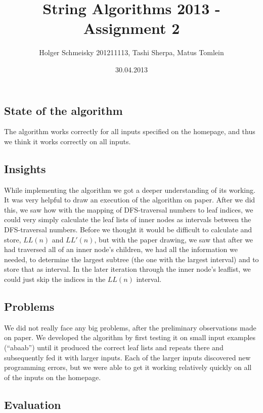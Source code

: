 \documentclass[a4paper,10pt]{article}
\title{String Algorithms 2013 - Assignment 2}
\author{Holger Schmeisky  201211113, Tashi Sherpa, Matus Tomlein}
\date{30.04.2013}
\begin{document}
\maketitle

\subsection*{State of the algorithm}
The algorithm works correctly for all inputs specified on the homepage, and thus we think it works correctly on all inputs.

\subsection*{Insights}
While implementing the algorithm we got a deeper understanding of its working.\\ 
It was very helpful to draw an execution of the algorithm on paper. After we did this, we saw how with the mapping of DFS-traversal numbers to leaf indices, we could very simply calculate the leaf lists of inner nodes as intervals between the DFS-traversal numbers. Before we thought it would be difficult to calculate and store, $LL(n)$ and $LL'(n)$, but with the paper drawing, we saw that after we had traversed all of an inner node's children, we had all the information we needed, to determine the largest subtree (the one with the largest interval) and to store that as interval. In the later iteration through the inner node's leaflist, we could just skip the indices in the $LL(n)$ interval.

\subsection*{Problems}
We did not really face any big problems, after the preliminary observations made on paper. We developed the algorithm by first testing it on small input examples (``abaab'') until it produced the correct leaf lists and repeats there and subsequently fed it with larger inputs. Each of the larger inputs discovered new programming errors, but we were able to get it working relatively quickly on all of the inputs on the homepage.

\clearpage
\subsection*{Evaluation}
\end{document}
